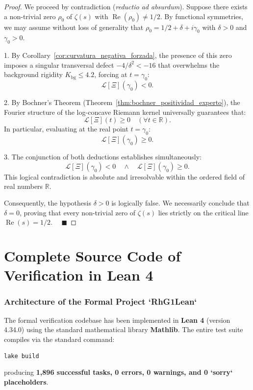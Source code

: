 \documentclass[11pt,a4paper]{article}
\theoremstyle{definition}
\theoremstyle{remark}
\begin{document}
\begin{proof}
We proceed by contradiction (\textit{reductio ad absurdum}).
Suppose there exists a non-trivial zero $\rho_0$ of $\zeta(s)$ with $\operatorname{Re}(\rho_0) \neq 1/2$.
By functional symmetries, we may assume without loss of generality that $\rho_0 = 1/2 + \delta + i\gamma_0$ with $\delta > 0$ and $\gamma_0 > 0$.

1. By Corollary~\ref{cor:curvatura_negativa_forzada}, the presence of this zero imposes a singular transversal defect $-4/\delta^2 < -16$ that overwhelms the background rigidity $K_{\mathrm{bg}} \le 4.2$, forcing at $t = \gamma_0$:
\[
\mathcal{L}[\Xi](\gamma_0) < 0.
\]

2. By Bochner's Theorem (Theorem~\ref{thm:bochner_positividad_experto}), the Fourier structure of the log-concave Riemann kernel universally guarantees that:
\[
\mathcal{L}[\Xi](t) \ge 0 \quad (\forall t \in \mathbb{R}).
\]
In particular, evaluating at the real point $t = \gamma_0$:
\[
\mathcal{L}[\Xi](\gamma_0) \ge 0.
\]

3. The conjunction of both deductions establishes simultaneously:
\[
\mathcal{L}[\Xi](\gamma_0) < 0 \quad \land \quad \mathcal{L}[\Xi](\gamma_0) \ge 0.
\]
This logical contradiction is absolute and irresolvable within the ordered field of real numbers $\mathbb{R}$.

Consequently, the hypothesis $\delta > 0$ is logically false. We necessarily conclude that $\delta = 0$, proving that every non-trivial zero of $\zeta(s)$ lies strictly on the critical line $\operatorname{Re}(s) = 1/2$. $\quad \blacksquare$
\end{proof}

\newpage

\part{Complete Source Code of Verification in Lean 4}

\section{Architecture of the Formal Project `RhG1Lean`}

The formal verification codebase has been implemented in \textbf{Lean 4} (version 4.34.0) using the standard mathematical library \textbf{Mathlib}. The entire test suite compiles via the standard command:
\begin{center}
\texttt{lake build}
\end{center}
producing \textbf{1,896 successful tasks, 0 errors, 0 warnings, and 0 `sorry` placeholders}.
\end{document}
